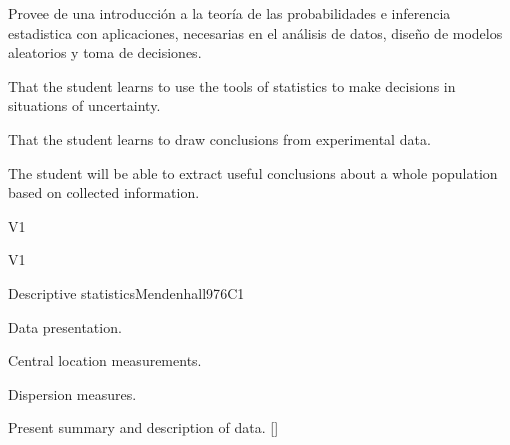 
\begin{syllabus}


\begin{justification}
   Provee de una introducción a la teoría de las probabilidades e inferencia estadistica  con aplicaciones, necesarias en el análisis de datos, diseño de modelos aleatorios y toma de decisiones.
\end{justification}

\begin{goals}
\item That the student learns to use the tools of statistics to make decisions in situations of uncertainty.
\item That the student learns to draw conclusions from experimental data.
\item The student will be able to extract useful conclusions about a whole population based on collected information.
\end{goals}

\begin{outcomes}{V1}
   \item {}
   \item {}
   \item {}
\end{outcomes}

\begin{competences}{V1}
    \item {} 
    \item {}
    \item {}
\end{competences}


\begin{unit}{}{Descriptive statistics}{Mendenhall97}{6}{C1}
\begin{topics}
      \item Data presentation.
      \item Central location measurements.
      \item Dispersion measures.
   \end{topics}

   \begin{learningoutcomes}
      \item Present summary and description of data. [\Usage]
   \end{learningoutcomes}
\end{unit}


\end{syllabus}
